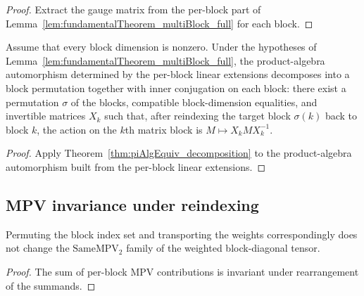 \begin{proof}
    \leanok
    Extract the gauge matrix from the per-block part of
    Lemma~\ref{lem:fundamentalTheorem_multiBlock_full} for each block.
\end{proof}

\begin{lemma}%
    \label{lem:fundamentalTheorem_multiBlock_decomposition}
    \leanok
    Assume that every block dimension is nonzero.
    Under the hypotheses of
    Lemma~\ref{lem:fundamentalTheorem_multiBlock_full}, the product-algebra
    automorphism determined by the per-block linear extensions decomposes into
    a block permutation together with inner conjugation on each block: there
    exist a permutation $\sigma$ of the blocks, compatible block-dimension
    equalities, and invertible matrices $X_k$ such that, after reindexing the
    target block $\sigma(k)$ back to block $k$, the action on the $k$th matrix
    block is $M \mapsto X_k M X_k^{-1}$.
\end{lemma}

\begin{proof}
    \leanok
    Apply Theorem~\ref{thm:piAlgEquiv_decomposition} to the product-algebra
    automorphism built from the per-block linear extensions.
\end{proof}

\subsection{MPV invariance under reindexing}%
\label{subsec:mpv_reindexing}

\begin{lemma}\label{lem:mpv_perm_blocks}
    \leanok
    Permuting the block index set and transporting the weights
    correspondingly does not change the $\mathrm{SameMPV}_2$ family of the
    weighted block-diagonal tensor.
\end{lemma}

\begin{proof}\leanok
    The sum of per-block MPV contributions is invariant under rearrangement
    of the summands.
\end{proof}

